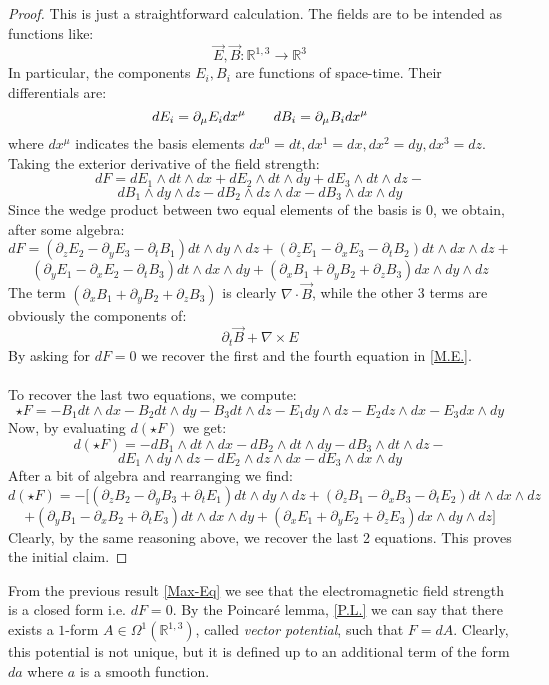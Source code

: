 \documentclass[12pt,a4paper]{report}
\theoremstyle{definition}
\theoremstyle{Theorem}
\theoremstyle{definition}
\theoremstyle{definition}
\begin{document}
	\begin{proof}
		This is just a straightforward calculation. The fields are to be intended as functions like:
		$$\vec{E},\vec{B}:\mathbb{R}^{1,3}\rightarrow\mathbb{R}^3$$
		In particular, the components $E_i,B_i$ are functions of space-time. Their differentials are:
		$$dE_i=\partial_\mu E_idx^\mu\hspace{20 pt}dB_i=\partial_\mu B_idx^\mu$$
		where $dx^\mu$ indicates the basis elements $dx^0=dt,dx^1=dx,dx^2=dy,dx^3=dz$. Taking the exterior derivative of the field strength:
		$$dF=dE_1\wedge dt\wedge dx+dE_2\wedge dt\wedge dy+dE_3\wedge dt\wedge dz-$$
		$$dB_1\wedge dy\wedge dz-dB_2\wedge dz\wedge dx-dB_3\wedge dx\wedge dy$$
		Since the wedge product between two equal elements of the basis is 0, we obtain, after some algebra:
		$$dF=(\partial_z E_2-\partial_y E_3-\partial_t B_1)dt\wedge dy\wedge dz+(\partial_z E_1-\partial_x E_3-\partial_t B_2)dt\wedge dx\wedge dz+$$
		$$(\partial_y E_1-\partial_x E_2-\partial_t B_3)dt\wedge dx\wedge dy+ (\partial_x B_1+ \partial_y B_2+\partial_z B_3)dx\wedge dy\wedge dz$$
		The term $(\partial_x B_1+ \partial_y B_2+\partial_z B_3)$ is clearly $\nabla\cdot \vec{B}$, while the other 3 terms are obviously the components of:
		$$\partial_t\vec{B}+\nabla\times E$$
		By asking for $dF=0$ we recover the first and the fourth equation in \ref*{M.E.}.\\
		\\
		To recover the last two equations, we compute: 
		$$\star F=-B_1 dt\wedge dx-B_2dt\wedge dy-B_3 dt\wedge dz-E_1 dy\wedge dz-E_2 dz\wedge dx-E_3 dx\wedge dy$$
		Now, by evaluating $d(\star F)$ we get:
		$$d(\star F)=-dB_1\wedge dt\wedge dx-dB_2\wedge dt\wedge dy-dB_3\wedge dt\wedge dz-$$
		$$dE_1\wedge dy\wedge dz-dE_2\wedge dz\wedge dx-dE_3\wedge dx\wedge dy$$
		After a bit of algebra and rearranging we find:
		$$d(\star F)=-\bigg[(\partial_z B_2-\partial_y B_3+\partial_t E_1)dt\wedge dy\wedge dz+
		(\partial_z B_1-\partial_x B_3-\partial_t E_2)dt\wedge dx\wedge dz
		$$
		$$+(\partial_y B_1-\partial_x B_2+\partial_t E_3)dt\wedge dx\wedge dy+(\partial_x E_1+\partial_y E_2+\partial_z E_3)dx\wedge dy\wedge dz\bigg]$$
		Clearly, by the same reasoning above, we recover the last 2 equations. This proves the initial claim.
	\end{proof}
	From the previous result \ref{Max-Eq} we see that the electromagnetic field strength is a closed form i.e. $dF=0$. By the Poincaré lemma, \ref{P.L.} we can say that there exists a $1$-form $A\in\Omega^1(\mathbb{R}^{1,3})$, called \textit{vector potential}, such that $F=dA$. Clearly, this potential is not unique, but it is defined up to an additional term of the form $da$ where $a$ is a smooth function.
\end{document}
